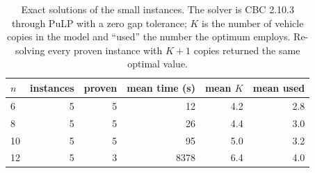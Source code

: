 \begin{table}[tb]
\centering
\caption{Exact solutions of the small instances. The solver is CBC 2.10.3 through PuLP with a zero gap tolerance; $K$ is the number of vehicle copies in the model and ``used'' the number the optimum employs. Re-solving every proven instance with $K+1$ copies returned the same optimal value.}
\label{tab:exactsolver}
\small
\setlength{\tabcolsep}{4pt}
\begin{tabular}{@{}lrrrrr@{}}
\toprule
$n$ & instances & proven & mean time (s) & mean $K$ & mean used \\
\midrule
6 & 5 & 5 & 12 & 4.2 & 2.8 \\
8 & 5 & 5 & 26 & 4.4 & 3.0 \\
10 & 5 & 5 & 95 & 5.0 & 3.2 \\
12 & 5 & 3 & 8378 & 6.4 & 4.0 \\
\bottomrule
\end{tabular}
\end{table}
